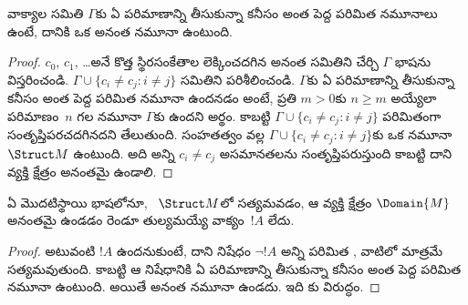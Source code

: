 \documentclass[../../../include/open-logic-section]{subfiles}
\begin{document}

\begin{thm}
వాక్యాల సమితి $\Gamma$కు ఏ పరిమాణాన్ని తీసుకున్నా కనీసం అంత పెద్ద పరిమిత
నమూనాలు ఉంటే, దానికి ఒక అనంత నమూనా ఉంటుంది.
\end{thm}

\begin{proof}
$c_0$, $c_1$, \dots అనే కొత్త స్థిరసంకేతాల లెక్కించదగిన అనంత సమితిని చేర్చి
$\Gamma$ భాషను విస్తరించండి. $\Gamma \cup \{c_i \neq c_j :
i \neq j\}$ సమితిని పరిశీలించండి. $\Gamma$కు ఏ పరిమాణాన్ని తీసుకున్నా కనీసం అంత పెద్ద పరిమిత
నమూనా ఉందనడం అంటే, ప్రతి $m>0$కు $n\ge m$ అయ్యేలా
పరిమాణం~$n$ గల నమూనా $\Gamma$కు ఉందని అర్థం. కాబట్టి $\Gamma
\cup \{c_i \neq c_j : i \neq j\}$ పరిమితంగా సంతృప్తిపరచదగినదని
తేలుతుంది. సంహతత్వం వల్ల $\Gamma \cup \{c_i \neq c_j : i \neq j\}$కు
ఒక నమూనా $\Struct M$ ఉంటుంది. అది అన్ని $c_i \neq c_j$ అసమానతలను
సంతృప్తిపరుస్తుంది కాబట్టి దాని వ్యక్తి క్షేత్రం అనంతమై ఉండాలి.
\end{proof}

\begin{prop}
ఏ మొదటిస్థాయి భాషలోనూ, ~$\Struct M$లో
సత్యమవడం, ఆ  వ్యక్తి క్షేత్రం
$\Domain{M}$ అనంతమై ఉండడం రెండూ తుల్యమయ్యే వాక్యం~$!A$ లేదు.
\end{prop}

\begin{proof}
అటువంటి $!A$ ఉందనుకుంటే, దాని నిషేధం $\lnot !A$ అన్ని పరిమిత
, వాటిలో మాత్రమే సత్యమవుతుంది. కాబట్టి
ఆ నిషేధానికి ఏ పరిమాణాన్ని తీసుకున్నా కనీసం అంత పెద్ద పరిమిత నమూనా ఉంటుంది. అయితే అనంత నమూనా
ఉండదు. ఇది కు విరుద్ధం.
\end{proof}
\end{document}
